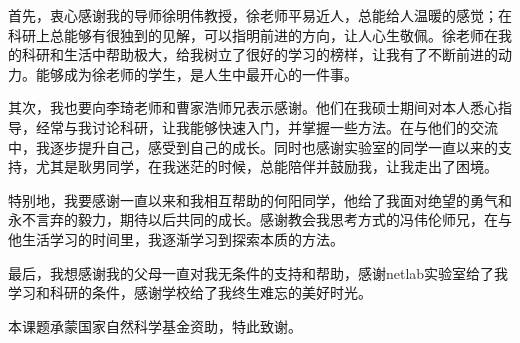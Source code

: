 \begin{acknowledgement}
  首先，衷心感谢我的导师徐明伟教授，徐老师平易近人，总能给人温暖的感觉；在科研上总能够有很独到的见解，可以指明前进的方向，让人心生敬佩。徐老师在我的科研和生活中帮助极大，给我树立了很好的学习的榜样，让我有了不断前进的动力。能够成为徐老师的学生，是人生中最开心的一件事。

  其次，我也要向李琦老师和曹家浩师兄表示感谢。他们在我硕士期间对本人悉心指导，经常与我讨论科研，让我能够快速入门，并掌握一些方法。在与他们的交流中，我逐步提升自己，感受到自己的成长。同时也感谢实验室的同学一直以来的支持，尤其是耿男同学，在我迷茫的时候，总能陪伴并鼓励我，让我走出了困境。

  特别地，我要感谢一直以来和我相互帮助的何阳同学，他给了我面对绝望的勇气和永不言弃的毅力，期待以后共同的成长。感谢教会我思考方式的冯伟伦师兄，在与他生活学习的时间里，我逐渐学习到探索本质的方法。

  最后，我想感谢我的父母一直对我无条件的支持和帮助，感谢netlab实验室给了我学习和科研的条件，感谢学校给了我终生难忘的美好时光。

  本课题承蒙国家自然科学基金资助，特此致谢。

\end{acknowledgement}
